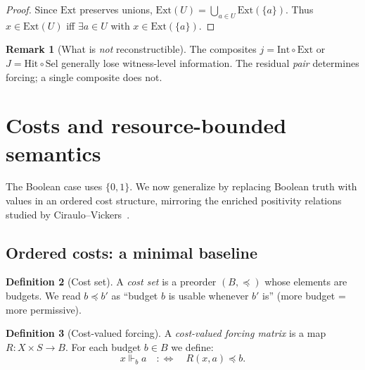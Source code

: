 \documentclass[11pt]{article}
\theoremstyle{definition}
\newtheorem{definition}{Definition}[section]
\newtheorem{remark}[definition]{Remark}
\theoremstyle{plain}
\newcommand{\Ext}{\mathrm{Ext}}
\newcommand{\Intt}{\mathrm{Int}}
\newcommand{\Hit}{\mathrm{Hit}}
\newcommand{\Sel}{\mathrm{Sel}}
\newcommand{\forces}{\Vdash}
\begin{document}
\begin{proof}
Since $\Ext$ preserves unions, $\Ext(U)=\bigcup_{a\in U}\Ext(\{a\})$.
Thus $x\in \Ext(U)$ iff $\exists a\in U$ with $x\in \Ext(\{a\})$.
\end{proof}

\begin{remark}[What is \emph{not} reconstructible]
The composites $j=\Intt\circ\Ext$ or $J=\Hit\circ\Sel$ generally lose witness-level information.
The residual \emph{pair} determines forcing; a single composite does not.
\end{remark}

\section{Costs and resource-bounded semantics}

The Boolean case uses $\{0,1\}$. We now generalize by replacing Boolean truth with values in an ordered cost structure,
mirroring the enriched positivity relations studied by Ciraulo--Vickers~\cite{CirauloVickers2016}.

\subsection{Ordered costs: a minimal baseline}\label{subsec:ordered-costs}

\begin{definition}[Cost set]\label{def:cost-set}
A \emph{cost set} is a preorder $(B,\preceq)$ whose elements are budgets.
We read $b\preceq b'$ as ``budget $b$ is usable whenever $b'$ is'' (more budget = more permissive).
\end{definition}

\begin{definition}[Cost-valued forcing]\label{def:cost-valued-forcing}
A \emph{cost-valued forcing matrix} is a map $R:X\times S\to B$.
For each budget $b\in B$ we define:
\[
x \forces_b a \quad:\!\!\iff\quad R(x,a)\preceq b.
\]
\end{definition}
\end{document}
